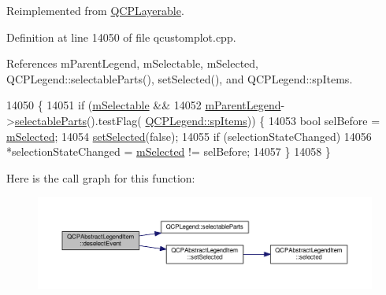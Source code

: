 Reimplemented from \hyperlink{class_q_c_p_layerable_ae546370644a5551c76af739afc008bee}{Q\+C\+P\+Layerable}.



Definition at line 14050 of file qcustomplot.\+cpp.



References m\+Parent\+Legend, m\+Selectable, m\+Selected, Q\+C\+P\+Legend\+::selectable\+Parts(), set\+Selected(), and Q\+C\+P\+Legend\+::sp\+Items.


\begin{DoxyCode}
14050                                                                      \{
14051   \textcolor{keywordflow}{if} (\hyperlink{class_q_c_p_abstract_legend_item_aa84029f57b1b32f642fb7db63c3fc2c2}{mSelectable} &&
14052       \hyperlink{class_q_c_p_abstract_legend_item_aafcd9fc6fcb10f4a8d46037011afafe8}{mParentLegend}->\hyperlink{class_q_c_p_legend_aa90c7fdbad7a0e93527bafb1f1f49a43}{selectableParts}().testFlag(
      \hyperlink{class_q_c_p_legend_a5404de8bc1e4a994ca4ae69e2c7072f1a768bfb95f323db4c66473375032c0af7}{QCPLegend::spItems})) \{
14053     \textcolor{keywordtype}{bool} selBefore = \hyperlink{class_q_c_p_abstract_legend_item_ae58ebebbd0c36cc6fe897483369984d2}{mSelected};
14054     \hyperlink{class_q_c_p_abstract_legend_item_a6eed93b0ab99cb3eabb043fb08179c2b}{setSelected}(\textcolor{keyword}{false});
14055     \textcolor{keywordflow}{if} (selectionStateChanged)
14056       *selectionStateChanged = \hyperlink{class_q_c_p_abstract_legend_item_ae58ebebbd0c36cc6fe897483369984d2}{mSelected} != selBefore;
14057   \}
14058 \}
\end{DoxyCode}


Here is the call graph for this function\+:\nopagebreak
\begin{figure}[H]
\begin{center}
\leavevmode
\includegraphics[width=350pt]{class_q_c_p_abstract_legend_item_ae64e667e7c5b85cd92c9b91928faef28_cgraph}
\end{center}
\end{figure}


\hypertarget{class_q_c_p_abstract_legend_item_a97dedc084c672359710f16b31d046d1d}{}
